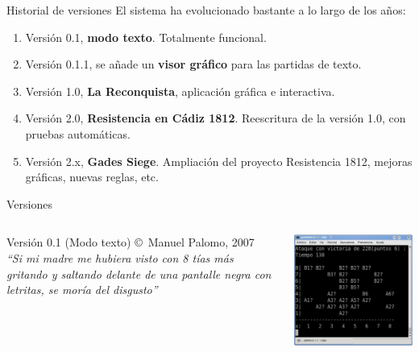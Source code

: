 \documentclass[smaller,spanish,xcolor=svgnames]{beamer}
\begin{document}
\begin{frame}{Historial de versiones}
  El sistema ha evolucionado bastante a lo largo de los años:
  \begin{enumerate}
  \item Versión 0.1, \textbf{modo texto}. Totalmente funcional.
  \item Versión 0.1.1, se añade un \textbf{visor gráfico} para las partidas de texto.
  \item Versión 1.0, \textbf{La Reconquista}, aplicación gráfica e interactiva.
  \item Versión 2.0, \textbf{Resistencia en Cádiz 1812}. Reescritura de la versión 1.0, con
    pruebas automáticas.
  \item Versión 2.x, \textbf{Gades Siege}. Ampliación del proyecto Resistencia 1812,
    mejoras gráficas, nuevas reglas, etc.
  \end{enumerate}  
\end{frame}

\begin{frame}{Versiones}
  \begin{columns}
    \begin{block}{Versión 0.1 (Modo texto)}
      \copyright \, Manuel Palomo, 2007\\
      \textit{``Si mi madre me hubiera visto con 8 tías más gritando y saltando delante de una pantalle negra con letritas, se moría del disgusto''}
    \end{block}
    \includegraphics[width=\textwidth]{img/version_1}
  \end{columns}  
\end{frame}
\end{document}
